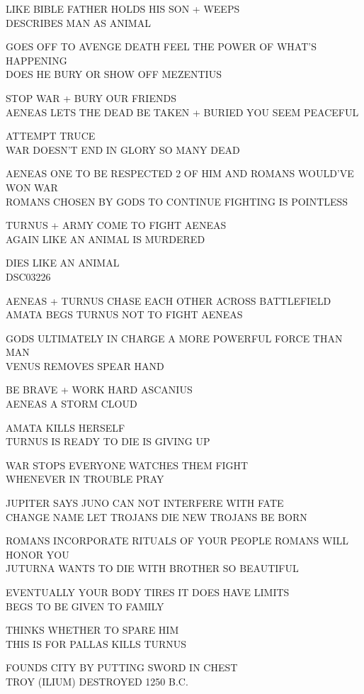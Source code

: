 \documentclass[10pt,letterpaper]{article}
\begin{document}
LIKE BIBLE FATHER HOLDS HIS SON + WEEPS\\
DESCRIBES MAN AS ANIMAL

GOES OFF TO AVENGE DEATH FEEL THE POWER OF WHAT'S HAPPENING\\
DOES HE BURY OR SHOW OFF MEZENTIUS

STOP WAR + BURY OUR FRIENDS\\
AENEAS LETS THE DEAD BE TAKEN + BURIED YOU SEEM PEACEFUL

ATTEMPT TRUCE\\
WAR DOESN'T END IN GLORY SO MANY DEAD

AENEAS ONE TO BE RESPECTED 2 OF HIM AND ROMANS WOULD'VE WON WAR\\
ROMANS CHOSEN BY GODS TO CONTINUE FIGHTING IS POINTLESS

TURNUS + ARMY COME TO FIGHT AENEAS\\
AGAIN LIKE AN ANIMAL IS MURDERED

DIES LIKE AN ANIMAL\\
DSC03226

AENEAS + TURNUS CHASE EACH OTHER ACROSS BATTLEFIELD\\
AMATA BEGS TURNUS NOT TO FIGHT AENEAS

GODS ULTIMATELY IN CHARGE A MORE POWERFUL FORCE THAN MAN\\
VENUS REMOVES SPEAR HAND

BE BRAVE + WORK HARD ASCANIUS\\
AENEAS A STORM CLOUD

AMATA KILLS HERSELF\\
TURNUS IS READY TO DIE IS GIVING UP

WAR STOPS EVERYONE WATCHES THEM FIGHT\\
WHENEVER IN TROUBLE PRAY

JUPITER SAYS JUNO CAN NOT INTERFERE WITH FATE\\
CHANGE NAME LET TROJANS DIE NEW TROJANS BE BORN

ROMANS INCORPORATE RITUALS OF YOUR PEOPLE ROMANS WILL HONOR YOU\\
JUTURNA WANTS TO DIE WITH BROTHER SO BEAUTIFUL

EVENTUALLY YOUR BODY TIRES IT DOES HAVE LIMITS\\
BEGS TO BE GIVEN TO FAMILY

THINKS WHETHER TO SPARE HIM\\
THIS IS FOR PALLAS KILLS TURNUS

FOUNDS CITY BY PUTTING SWORD IN CHEST\\
TROY (ILIUM) DESTROYED 1250 B.C.
\end{document}
